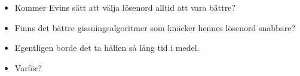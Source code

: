 \begin{frame}
  \begin{question}
    \begin{itemize}
      \item Kommer Evins sätt att välja lösenord alltid att vara bättre?
      \item Finns det bättre gissningsalgoritmer som knäcker hennes lösenord 
        snabbare?
    \end{itemize}
  \end{question}
\end{frame}

\begin{frame}
  \begin{question}
    \begin{itemize}
      \item Egentligen borde det ta hälfen så lång tid i medel.
      \item Varför?
    \end{itemize}
  \end{question}
\end{frame}



